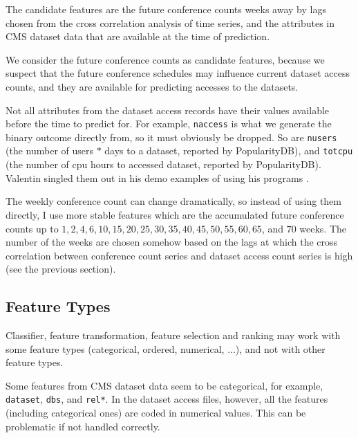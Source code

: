 \documentclass[preprint, 12pt]{elsarticle}
\begin{document}
The candidate features are the future conference counts weeks away by lags chosen from the cross correlation analysis of time series, and the attributes in CMS dataset data that are available at the time of prediction.

We consider the future conference counts as candidate features, because we suspect that the future conference schedules may influence current dataset access counts, and they are available for predicting accesses to the datasets.

Not all attributes from the dataset access records have their values available before the time to predict for.
For example,
\verb|naccess| is what we generate the binary outcome directly from, so it must obviously be dropped.
So are \verb|nusers| (the number of users $*$ days to a dataset, reported by PopularityDB), and \verb|totcpu| (the number of cpu hours to accessed dataset, reported by PopularityDB).
Valentin  singled them out in his demo examples of using his programs \cite{web:vk}.

The weekly conference count can change dramatically, so instead of using them directly, I use more stable features which are the accumulated future conference counts up to $1, 2, 4, 6, 10, 15, 20, 25, 30, 35, 40, 45, 50, 55, 60, 65$, and $70$ weeks. The number of the weeks are chosen somehow based on the lags at which the cross correlation between conference count series and dataset access count series is high (see the previous section).


\subsection{Feature Types}

Classifier, feature transformation, feature selection and ranking may work with some feature types (categorical, ordered, numerical, ...), and not with other feature types.

Some features from CMS dataset data seem to be categorical, for example, \verb|dataset|, \verb|dbs|, and \verb|rel*|.
In the dataset access files, however, all the features (including categorical ones) are coded in numerical values.
This can be problematic if not handled correctly.
  
\end{document}
